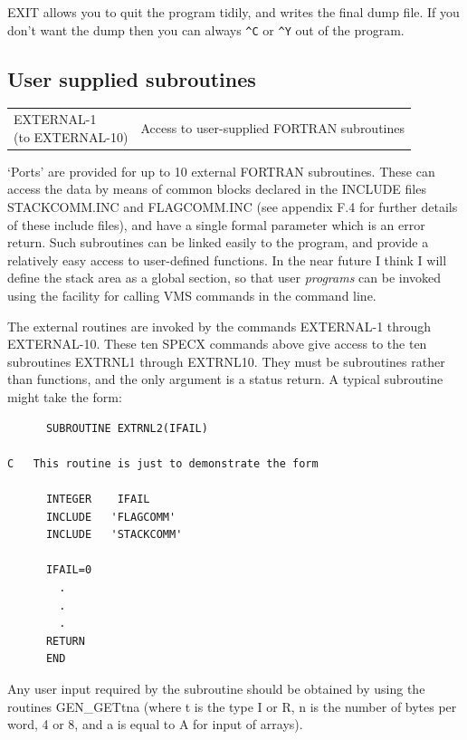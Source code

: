 \documentclass[11pt,twoside]{report}
\begin{document}
EXIT allows you to quit the program tidily, and writes the final dump file. If
you don't want the dump then you can always \verb+^C+ or \verb+^Y+ out of the
program. 

\subsection{User supplied subroutines}

\label{externals}
\begin{tabular}{ll}
\parbox[T]{1.5in}{EXTERNAL-1\\
  (to EXTERNAL-10)}     & Access to user-supplied FORTRAN subroutines\\
\end{tabular}

`Ports' are provided for up to 10 external FORTRAN subroutines. These can
access the data by means of common blocks declared in the INCLUDE files
STACKCOMM.INC and FLAGCOMM.INC (see
appendix F.4 for further details of these include files), and have a single
formal parameter which is an error return. Such subroutines can be linked
easily to the program, and provide a relatively easy access to user-defined
functions. In the near future I think I will define the stack area as a global
section, so that user {\em programs} can be invoked using the facility for
calling VMS commands in the command line.

The external routines are invoked by the commands EXTERNAL-1 through
EXTERNAL-10. These ten SPECX commands above give access to the ten subroutines
EXTRNL1 through EXTRNL10. They must be subroutines rather than functions, and
the only argument is a status return. A typical subroutine might take the form:

\begin{verbatim}
      SUBROUTINE EXTRNL2(IFAIL)

C   This routine is just to demonstrate the form

      INTEGER    IFAIL
      INCLUDE   'FLAGCOMM'
      INCLUDE   'STACKCOMM'

      IFAIL=0
        .
        .
        .
      RETURN
      END
\end{verbatim}

Any user input required by the subroutine should be obtained by using the
rout\-ines GEN\_GETtna (where t is the type I
or R, n is the number of bytes per word, 4 or 8, and a is equal to A for input
of arrays). 
\end{document}
